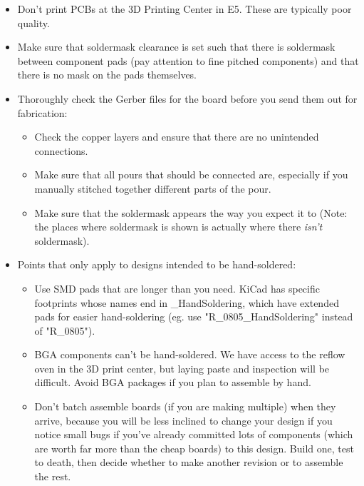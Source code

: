 \documentclass{article}
\begin{document}
\begin{itemize}
\item Don't print PCBs at the 3D Printing Center in E5. These are typically poor quality.
\item Make sure that soldermask clearance is set such that there is soldermask between component pads (pay attention to fine pitched components) and that there is no mask on the pads themselves.
\item Thoroughly check the Gerber files for the board before you send them out for fabrication:
    \begin{itemize}
    \item Check the copper layers and ensure that there are no unintended connections.
    \item Make sure that all pours that should be connected are, especially if you manually stitched together different parts of the pour.
    \item Make sure that the soldermask appears the way you expect it to (Note: the places where soldermask is shown is actually where there \textit{isn't} soldermask).
    \end{itemize}
\item Points that only apply to designs intended to be hand-soldered:
\begin{itemize}
\item Use SMD pads that are longer than you need. KiCad has specific footprints whose names end in \_HandSoldering, which have extended pads for easier hand-soldering (eg. use "R\_0805\_HandSoldering" instead of "R\_0805").
\item BGA components can't be hand-soldered. We have access to the reflow oven in the 3D print center, but laying paste and inspection will be difficult. Avoid BGA packages if you plan to assemble by hand.
\item Don't batch assemble boards (if you are making multiple) when they arrive, because you will be less inclined to change your design if you notice small bugs if you've already committed lots of components (which are worth far more than the cheap boards) to this design. Build one, test to death, then decide whether to make another revision or to assemble the rest.
\end{itemize}
\end{itemize}

\end{document}
